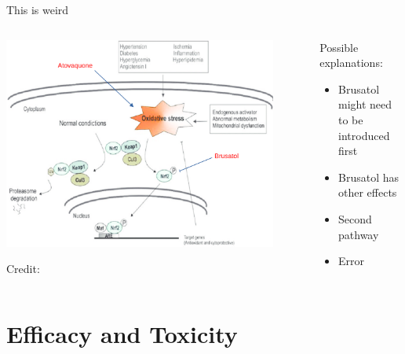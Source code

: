 \documentclass{beamer}
\begin{document}
\begin{frame}{This is weird}


    \begin{columns}
        \begin{column}{0.7\textwidth}
            \begin{center}
                \includegraphics[width = 0.9\textwidth]{figs/nrf2-pathway-annotated.png}


        \hspace*{15pt}\hbox{\scriptsize Credit:}
            \end{center}
        \end{column}
        \begin{column}{0.3\textwidth}
            
            Possible explanations: \begin{itemize}
                \item \alert{Brusatol might need to be introduced first}
                \item Brusatol has other effects
                \item Second pathway
                \item Error
            \end{itemize}
        \end{column}
    \end{columns}
\end{frame}

\section{Efficacy and Toxicity}
\end{document}
